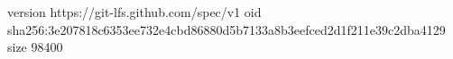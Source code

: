 version https://git-lfs.github.com/spec/v1
oid sha256:3e207818c6353ee732e4cbd86880d5b7133a8b3eefced2d1f211e39c2dba4129
size 98400
